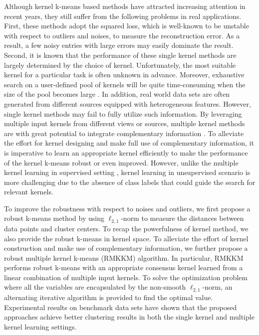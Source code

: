 \documentclass{article}
\begin{document}
Although kernel k-means based methods have attracted increasing attention in recent years, they still suffer from the following problems in real applications. First, these methods adopt the squared loss, which is well-known to be unstable with respect to outliers and noises, to measure the reconstruction error. As a result, a few noisy entries with large errors may easily dominate the result. Second, it is known that the performance of these single kernel methods are largely determined by the choice of kernel. Unfortunately, the most suitable kernel for a particular task is often unknown in advance. Moreover, exhaustive search on a user-defined pool of kernels will be quite time-consuming when the size of the pool becomes large \cite{zeng2011feature}. In addition, real world data sets are often generated from different sources equipped with heterogeneous features. However, single kernel methods may fail to fully utilize such information. By leveraging multiple input kernels from different views or sources,  multiple kernel methods are with great potential to integrate complementary information \cite{yu2012optimized}. To alleviate the effort for kernel designing and make full use of complementary information, it is imperative to learn an appropriate kernel efficiently to make the performance of the kernel k-means robust or even improved. However, unlike the multiple kernel learning in supervised setting \cite{gonen2011multiple}, kernel learning in unsupervised scenario is more challenging due to the absence of class labels that could guide the search for relevant kernels.

To improve the robustness with respect to noises and outliers, we first propose a robust k-means method by using $\ell_{2,1}$-norm to measure the distances between data points and cluster centers. To recap the powerfulness of kernel method, we also provide the robust k-means in kernel space. To alleviate the effort of kernel construction and make use of complementary information, we further propose a robust multiple kernel k-means (RMKKM) algorithm. In particular, RMKKM performs robust k-means with an appropriate consensus kernel learned from a linear combination of multiple input kernels. To solve the optimization problem where all the variables are encapsulated by the non-smooth $\ell_{2,1}$-norm, an alternating iterative algorithm is provided to find the optimal value. Experimental results on benchmark data sets have shown that the proposed approaches achieve better clustering results in both the single kernel and multiple kernel learning settings.
\end{document}
